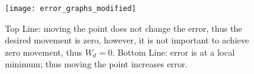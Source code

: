 \begin{figure}[t]
    \centering
    \texttt{[image: error\_graphs\_modified]}
    \caption{Top Line: moving the point does not change the error, thus the desired movement is zero, however, it is not important to achieve zero movement, thus $W_d = 0$.  Bottom Line: error is at a local minimum; thus moving the point increases error.}
    \label{fig:error_examples}
\end{figure}
